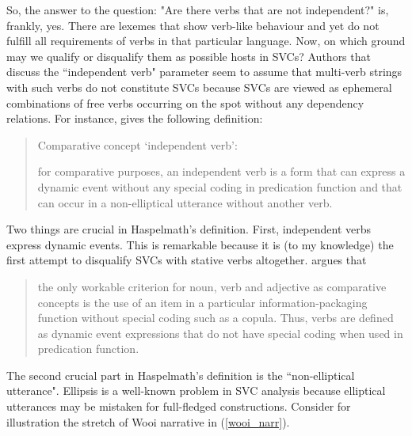 So, the answer to the question: "Are there verbs that are not independent?" is, frankly, yes. There are lexemes that show verb-like behaviour and yet do not fulfill all requirements of verbs in that particular language. Now, on which ground may we qualify or disqualify them as possible hosts in SVCs? Authors that discuss the ``independent verb" parameter seem to assume that multi-verb strings with such verbs do not constitute SVCs because SVCs are viewed as ephemeral combinations of free verbs occurring on the spot without any dependency relations. For instance, \citet[303]{haspelmath2016serial} gives the following definition: \begin{quote}Comparative concept `independent verb’:

for comparative purposes, an independent verb is a form that can express a dynamic event without any special coding in predication function and that can occur in a non-elliptical utterance without another verb.\end{quote}

Two things are crucial in Haspelmath's definition. First, independent verbs express dynamic events. This is remarkable because it is (to my knowledge) the first attempt to disqualify SVCs with stative verbs altogether. \citet[302]{haspelmath2016serial} argues that \begin{quote}the only workable criterion for noun, verb and adjective as comparative concepts is the use of an item in a particular information-packaging function without special coding such as a copula. Thus, verbs are defined as dynamic event expressions that do not have special coding when used in predication function.\end{quote}

The second crucial part in Haspelmath's definition is the ``non-elliptical utterance". Ellipsis is a well-known problem in SVC analysis because elliptical utterances may be mistaken for full-fledged constructions. Consider for illustration the stretch of Wooi narrative in (\ref{wooi_narr}).


